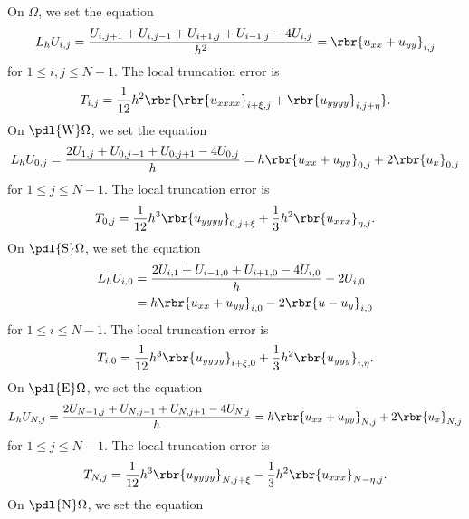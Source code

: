 \documentclass[english, nochinese]{pnote}
\begin{document}
On $\Omega$, we set the equation
\begin{equation}
L_h U_{ i, j } = \frac{ U_{ i, j + 1 } + U_{ i, j - 1 } + U_{ i + 1, j } + U_{ i - 1, j } - 4 U_{ i, j } }{h^2} = \rbr{ u_{ x x } + u_{ y y } }_{ i, j }
\end{equation}
for $ 1 \le i, j \le N - 1 $. The local truncation error is
\begin{equation}
T_{ i, j } = \frac{1}{12} h^2 \rbr{ \rbr{u_{ x x x x }}_{ i + \xi, j } + \rbr{u_{ y y y y }}_{ i, j + \eta } }.
\end{equation}
On $ \pdl{\text{W}} \Omega $, we set the equation
\begin{equation}
L_h U_{ 0, j } = \frac{ 2 U_{ 1, j } + U_{ 0, j - 1 } + U_{ 0, j + 1 } - 4 U_{ 0, j } }{h} = h \rbr{ u_{ x x } + u_{ y y } }_{ 0, j } + 2 \rbr{u_x}_{ 0, j }
\end{equation}
for $ 1 \le j \le N - 1 $.
The local truncation error is
\begin{equation}
T_{ 0, j } = \frac{1}{12} h^3 \rbr{u_{ y y y y }}_{ 0, j + \xi } + \frac{1}{3} h^2 \rbr{u_{ x x x }}_{ \eta, j }.
\end{equation}
On $ \pdl{\text{S}} \Omega $, we set the equation
\begin{equation}
\begin{split}
L_h U_{ i, 0 } &= \frac{ 2 U_{ i, 1 } + U_{ i - 1, 0 } + U_{ i + 1, 0 } - 4 U_{ i, 0 } }{h} - 2 U_{ i, 0 } \\
&= h \rbr{ u_{ x x } + u_{ y y } }_{ i, 0 } - 2 \rbr{ u - u_y }_{ i, 0 }
\end{split}
\end{equation}
for $ 1 \le i \le N - 1 $.
The local truncation error is
\begin{equation}
T_{ i, 0 } = \frac{1}{12} h^3 \rbr{u_{ y y y y }}_{ i + \xi, 0 } + \frac{1}{3} h^2 \rbr{u_{ y y y }}_{ i, \eta }.
\end{equation}
On $ \pdl{\text{E}} \Omega $, we set the equation
\begin{equation}
L_h U_{ N, j } = \frac{ 2 U_{ N - 1, j } + U_{ N, j - 1 } + U_{ N, j + 1 } - 4 U_{ N, j } }{h} = h \rbr{ u_{ x x } + u_{ y y } }_{ N, j } + 2 \rbr{u_x}_{ N, j }
\end{equation}
for $ 1 \le j \le N - 1 $.
The local truncation error is
\begin{equation}
T_{ N, j } = \frac{1}{12} h^3 \rbr{u_{ y y y y }}_{ N, j + \xi } - \frac{1}{3} h^2 \rbr{u_{ x x x }}_{ N - \eta, j }.
\end{equation}
On $ \pdl{\text{N}} \Omega $, we set the equation
\end{document}
